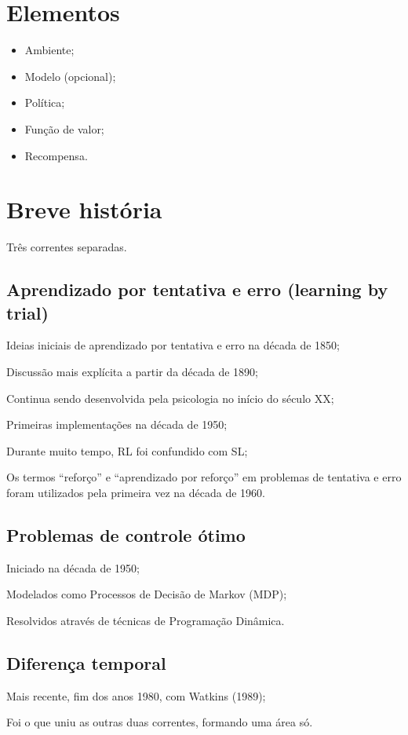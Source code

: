 \documentclass{article}
\begin{document}
\section{Elementos}

    \begin{itemize}
        \item Ambiente;
        \item Modelo (opcional);
        \item Política;
        \item Função de valor;
        \item Recompensa.
    \end{itemize}

\section{Breve história}

    Três correntes separadas.
    
    \subsection{Aprendizado por tentativa e erro (learning by trial)}
        Ideias iniciais de aprendizado por tentativa e erro na década de 1850;
        
        Discussão mais explícita a partir da década de 1890;
        
        Continua sendo desenvolvida pela psicologia no início do século XX;
        
        Primeiras implementações na década de 1950;
        
        Durante muito tempo, RL foi confundido com SL;
        
        Os termos “reforço” e “aprendizado por reforço” em problemas de tentativa e erro foram utilizados pela primeira vez na década de 1960.

    
    \subsection{Problemas de controle ótimo}
        Iniciado na década de 1950;
        
        Modelados como Processos de Decisão de Markov (MDP);
        
        Resolvidos através de técnicas de Programação Dinâmica.

    
    \subsection{Diferença temporal}
        Mais recente, fim dos anos 1980, com Watkins     (1989);
        
        Foi o que uniu as outras duas correntes, formando uma área só.

    
\end{document}
